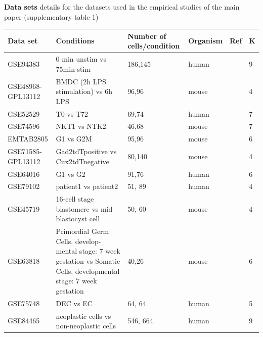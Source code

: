\documentclass[aoas,preprint]{imsart}
\begin{document}
\noindent
{\bf Data sets} details for the datasets used in the empirical studies of the main paper (supplementary table 1)


\begin{table}[h!]
\small
\centering
\begin{tabular}{ |p{2cm}|p{5cm}|p{2cm}|p{2cm}|p{2cm}|p{1cm}|}
\hline
 Data set & Conditions & Number of cells/condition & Organism  & Ref & K\\ \hline \hline
GSE94383 & 0 min unstim vs 75min stim & 186,145 & human & \citep{Lane} & 9\\ \hline
GSE48968-GPL13112 & BMDC (2h LPS stimulation) vs 6h LPS & 96,96 & mouse & \citep{Shalek} & 4\\ \hline
GSE52529 & T0 vs T72 & 69,74 & human & \citep{Trapnell} & 7\\ \hline
GSE74596 & NKT1 vs NTK2 & 46,68 & mouse & \citep{Engel} & 7\\ \hline
EMTAB2805 & G1 vs G2M & 95,96 & mouse & \citep{EMTAB} & 6\\ \hline
GSE71585-GPL13112 &Gad2tdTpositive vs Cux2tdTnegative  & 80,140 & mouse & \citep{Tasic} & 4\\ \hline
GSE64016 & G1 vs G2 & 91,76 & human & \citep{oscope} & 6\\ \hline
GSE79102 & patient1 vs patient2 & 51, 89 & human & \cite{sc3} & 4\\ \hline
GSE45719 & 16-cell stage blastomere vs mid blastocyst cell & 50, 60 & mouse & \citep{Deng193} & 4\\ \hline
GSE63818 & Primordial Germ Cells, develop- mental stage: 7 week gestation vs Somatic Cells, developmental stage: 7 week gestation & 40,26 & mouse & \citep{Guo} & 6\\ \hline
GSE75748 & DEC vs EC & 64, 64 & human & \citep{chu} & 5\\ \hline
GSE84465 & neoplastic cells vs non-neoplastic cells & 546, 664 & human & \citep{Darmanis} & 9\\ \hline
\end{tabular}
\end{table}




\end{document}
